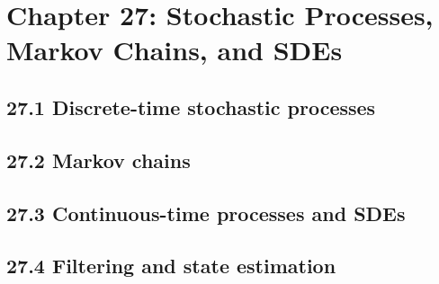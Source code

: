 \section{Chapter 27: Stochastic Processes, Markov Chains, and SDEs}

\subsection{27.1 Discrete-time stochastic processes}

\subsection{27.2 Markov chains}

\subsection{27.3 Continuous-time processes and SDEs}

\subsection{27.4 Filtering and state estimation}

\clearpage
